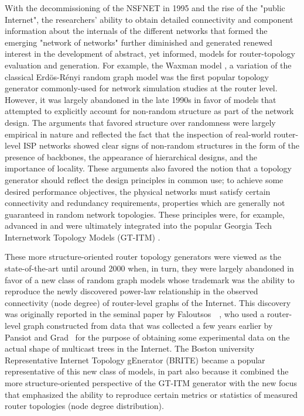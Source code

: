 With the decommissioning of the NSFNET in 1995 and the rise of the
"public Internet", the researchers' ability to obtain detailed
connectivity and component information about the internals of the
different networks that formed the emerging "network of networks"
further diminished and generated renewed interest in the development of
abstract, yet informed, models for router-topology evaluation and
generation. For example, the Waxman model \cite{Waxman88}, a variation
of the classical Erd\"{o}s-R\'{e}nyi random graph model \cite{erdos60}
was the first popular topology generator commonly-used for network
simulation studies at the router level. However, it was largely
abandoned in the late 1990s in favor of models that attempted to
explicitly account for non-random structure as part of the network
design. The arguments that favored structure over randomness were
largely empirical in nature and reflected the fact that the inspection
of real-world router-level ISP networks showed clear signs of
non-random structures in the form of the presence of backbones, the
appearance of hierarchical designs, and the importance of locality.
These arguments also favored the notion that a topology generator
should reflect the design principles in common use; \eg to achieve
some desired performance objectives, the physical networks must
satisfy certain connectivity and redundancy requirements, properties
which are generally not guaranteed in random network topologies.
These principles were, for example, advanced in
\cite{Zegura96,Calvert97,Zegura97} and were ultimately integrated into
the popular Georgia Tech Internetwork Topology Models (GT-ITM)
\cite{gt_itm}.
 
These more structure-oriented router topology generators were viewed
as the state-of-the-art until around 2000 when, in turn, they were
largely abandoned in favor of a new class of random graph models whose
trademark was the ability to reproduce the newly discovered power-law
relationship in the observed connectivity (\ie node degree) of
router-level graphs of the Internet. This discovery was originally
reported in the seminal paper by
Faloutsos~\etal~\cite{faloutsos99:_power_law_relat_of_inter_topol},
who used a router-level graph constructed from data that was collected
a few years earlier by Pansiot and Grad~\cite{pansiot98:_inter} for
the purpose of obtaining some experimental data on the actual shape of
multicast trees in the Internet. The Boston university Representative
Internet Topology gEnerator (BRITE) \cite{Medina01} became a popular
representative of this new class of models, in part also because it
combined the more structure-oriented perspective of the GT-ITM
generator with the new focus that emphasized the ability to reproduce
certain metrics or statistics of measured router topologies (\eg node
degree distribution).

